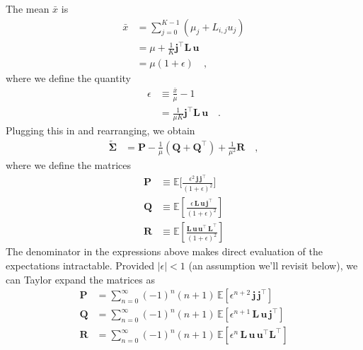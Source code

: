 \documentclass[modern]{aastex62}
\begin{document}
%
The mean $\bar{x}$ is
%
\begin{align}
    \bar{x} & = \sum\limits_{j=0}^{K-1}(\mu_j + L_{i,j}u_j)
    \nonumber                                               \\
            & =
    \mu + \frac{1}{K}\mathbf{j}^\top \mathbf{L} \, \mathbf{u}
    \nonumber                                               \\
            & = \mu(1 + \epsilon)
    \quad,
\end{align}
%
where we define the quantity
%
\begin{align}
    \label{eq:epsilon}
    \epsilon
     & \equiv \frac{\bar{x}}{\mu} - 1
    \nonumber                                                    \\[0.5em]
     & = \frac{1}{\mu K}\mathbf{j}^\top \mathbf{L} \, \mathbf{u}
    \quad.
\end{align}
%
Plugging this in and rearranging, we obtain
%
\begin{align}
    \label{eq:SigmaPQR}
    \tilde{\pmb{\Sigma}}
     & =
    \mathbf{P}
    -
    \frac{1}{\mu}
    \left(
    \mathbf{Q}
    +
    \mathbf{Q}^\top
    \right)
    +
    \frac{1}{\mu^2}
    \mathbf{R}
    \quad,
\end{align}
%
where we define the matrices
%
\begin{align}
    \label{eq:Pexact}
    \mathbf{P} & \equiv
    \mathbb{E}\Big[
        \frac{\epsilon^2 \, \mathbf{j} \, \mathbf{j}^\top}{(1 + \epsilon)^2}
        \Big]
    \\[0.5em]
    \label{eq:Qexact}
    \mathbf{Q} & \equiv
    \mathbb{E}\left[
        \frac{\epsilon\, \mathbf{L} \, \mathbf{u} \, \mathbf{j}^\top}{(1 + \epsilon)^2}
        \right]
    \\[0.5em]
    \label{eq:Rexact}
    \mathbf{R} & \equiv
    \mathbb{E}\left[
        \frac{ \mathbf{L} \, \mathbf{u} \, \mathbf{u}^\top \, \mathbf{L}^\top}{(1 + \epsilon)^2}
        \right]
\end{align}
%
The denominator in the expressions above makes direct evaluation of the expectations
intractable. Provided
$\big|\epsilon| < 1$ (an assumption we'll revisit below), we can Taylor expand the matrices as
%
\begin{align}
    \label{eq:WhereItAllGoesWrong1}
    \mathbf{P}
     & =
    \sum\limits_{n=0}^\infty
    (-1)^n (n + 1)
    \,
    \mathbb{E}\left[
        \epsilon^{n + 2}
        \,
        \mathbf{j} \, \mathbf{j}^\top
        \right]
    \\[0.5em]
    \label{eq:WhereItAllGoesWrong2}
    \mathbf{Q}
     & =
    \sum\limits_{n=0}^\infty
    (-1)^n (n + 1)
    \,
    \mathbb{E}\left[
        \epsilon^{n + 1} \,
        \mathbf{L}
        \,
        \mathbf{u}
        \,
        \mathbf{j}^\top
        \right]
    \\[0.5em]
    \label{eq:WhereItAllGoesWrong3}
    \mathbf{R}
     & =
    \sum\limits_{n=0}^\infty
    (-1)^n (n + 1)
    \,
    \mathbb{E}\left[
        \epsilon^n \, \mathbf{L} \, \mathbf{u} \, \mathbf{u}^\top \mathbf{L}^\top
        \right]
\end{align}
\end{document}
